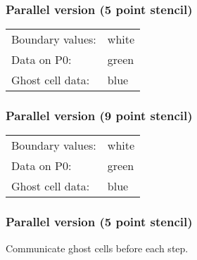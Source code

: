 \documentclass{beamer}
\begin{document}
\begin{frame}
  \frametitle{Parallel version (5 point stencil)}
  
  \begin{center}

  \vspace{5mm}
  \begin{tabular}{ll}
  Boundary values: & white \\
  Data on P0:      & green \\
  Ghost cell data: & blue
  \end{tabular}
  \end{center}

\end{frame}


\begin{frame}
  \frametitle{Parallel version (9 point stencil)}
  
  \begin{center}

  \vspace{5mm}
  \begin{tabular}{ll}
  Boundary values: & white \\
  Data on P0:      & green \\
  Ghost cell data: & blue
  \end{tabular}
  \end{center}

\end{frame}


\begin{frame}
  \frametitle{Parallel version (5 point stencil)}

  \begin{center}
    

    Communicate ghost cells before each step.
  \end{center}
\end{frame}
\end{document}
